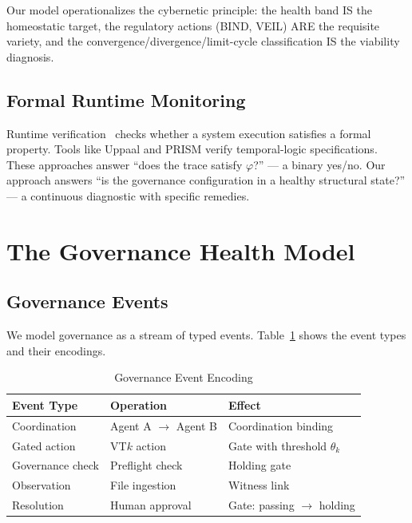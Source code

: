 \documentclass[sigconf,nonacm]{acmart}
\begin{document}
Our model operationalizes the cybernetic principle: the health band IS the
homeostatic target, the regulatory actions (BIND, VEIL) ARE the requisite
variety, and the convergence/divergence/limit-cycle classification IS the
viability diagnosis.

\subsection{Formal Runtime Monitoring}

Runtime verification~\cite{leucker} checks whether a system execution
satisfies a formal property. Tools like Uppaal and PRISM verify
temporal-logic specifications. These approaches answer ``does the trace
satisfy $\varphi$?'' --- a binary yes/no. Our approach answers ``is the
governance configuration in a healthy structural state?'' --- a continuous
diagnostic with specific remedies.

\section{The Governance Health Model}\label{sec:model}

\subsection{Governance Events}

We model governance as a stream of typed events. Table~\ref{tab:events}
shows the event types and their encodings.

\begin{table}[t]
  \caption{Governance Event Encoding}\label{tab:events}
  \small
  \begin{tabular}{@{}lll@{}}
    \toprule
    \textbf{Event Type} & \textbf{Operation} & \textbf{Effect} \\
    \midrule
    Coordination & Agent A $\to$ Agent B & Coordination binding \\
    Gated action & VT$k$ action & Gate with threshold $\theta_k$ \\
    Governance check & Preflight check & Holding gate \\
    Observation & File ingestion & Witness link \\
    Resolution & Human approval & Gate: passing $\to$ holding \\
    \bottomrule
  \end{tabular}
\end{table}
\end{document}

